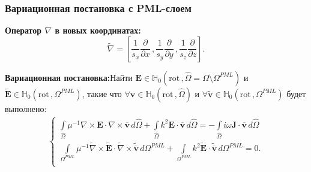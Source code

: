 \documentclass[aspectratio=43,usepdftitle=false]{beamer}
\newcommand{\MakeTitle}[1]{\frametitle{\hspace{1.5em}\textbf{#1} \hfill \insertframenumber{} }}
\begin{document}

\begin{frame}
	\MakeTitle{Вариационная постановка с PML-слоем}
	\textbf{Оператор $\nabla$ в новых координатах:}
	\begin{equation}
		\tilde{\nabla} = \left[ \frac{1}{s_x} \frac{\partial}{\partial x} \,, \frac{1}{s_y} \frac{\partial}{\partial y} \,, \frac{1}{s_z} \frac{\partial}{\partial z} \right] .
	\end{equation}

	\textbf{Вариационная постановка:}\newline Найти $\mathbf{E} \in \mathbb{H}_{0}( \mathrm{rot}\,, \widehat{\Omega} = \Omega \setminus {\Omega^{PML}} )$ и  $\tilde{\mathbf{E}} \in \mathbb{H}_{0}( \mathrm{rot}\,, {\Omega^{PML}} )$, такие что $\forall \mathbf{v} \in \mathbb{H}_{0}( \mathrm{rot}\,, \widehat{\Omega} )$ и $\forall \tilde{\mathbf{v}} \in \mathbb{H}_{0}( \mathrm{rot}\,, {\Omega^{PML}} )$ будет выполнено:
\begin{eqnarray}
	\begin{cases}
		\displaystyle
		\int\limits_{\widehat{\Omega}} \mu^{-1} \nabla \times \mathbf{E} \cdot \nabla \times \overline{\mathbf{v}} \,d\widehat{\Omega} + \int\limits_{\widehat{\Omega}} k^{2} \mathbf{E} \cdot \overline{\mathbf{v}} \,d\widehat{\Omega} = - \int\limits_{\widehat{\Omega}} i \omega \mathbf{J} \cdot \overline{\mathbf{v}} \,d\widehat{\Omega} \\
		\displaystyle
		\int\limits_{{\Omega^{PML}}} \mu^{-1} \tilde{\nabla} \times \tilde{\mathbf{E}} \cdot \tilde{\nabla} \times \tilde{\overline{\mathbf{v}}} \,d{\Omega^{PML}} + \int\limits_{{\Omega^{PML}}} k^{2} \tilde{\mathbf{E}} \cdot \tilde{\overline{\mathbf{v}}} \,d{\Omega^{PML}} = 0 . \\
	\end{cases}
\end{eqnarray}
\end{frame}

\end{document}
